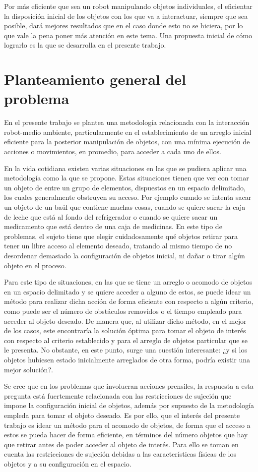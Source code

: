 Por más eficiente que sea un robot manipulando objetos individuales, el eficientar la disposición inicial de los objetos con los que va a interactuar, siempre que sea posible, dará mejores resultados que en el caso donde esto no se hiciera, por lo que vale la pena poner más atención en este tema. 
Una propuesta inicial de cómo lograrlo es la que se desarrolla en el presente trabajo.
%
%
\section{Planteamiento general del problema}
%
%
En el presente trabajo se plantea una metodología relacionada con la interacción robot-medio ambiente, particularmente en el establecimiento de un arreglo inicial eficiente para la posterior manipulación de objetos, con una mínima ejecución de acciones o movimientos, en promedio, para acceder a cada uno de ellos.

En la vida cotidiana existen varias situaciones en las que se pudiera aplicar una metodología como la que se propone.
Estas situaciones tienen que ver con tomar un objeto de entre un grupo de elementos, dispuestos en un espacio delimitado, los cuales generalmente obstruyen su acceso.
Por ejemplo cuando se intenta sacar un objeto de un baúl que contiene muchas cosas, cuando se quiere sacar la caja de leche que está al fondo del refrigerador o cuando se quiere sacar un medicamento que está dentro de una caja de medicinas. 
En este tipo de problemas, el sujeto tiene que elegir cuidadosamente qué objetos retirar para tener un libre acceso al elemento deseado, tratando al mismo tiempo de no desordenar demasiado la configuración de objetos inicial, ni dañar o tirar algún objeto en el proceso. 

Para este tipo de situaciones, en las que se tiene un arreglo o acomodo de objetos en un espacio delimitado y se quiere acceder a alguno de estos, se puede idear un método para realizar dicha acción de forma eficiente con respecto a algún criterio, como puede ser el número de obstáculos removidos o el tiempo empleado para acceder al objeto deseado.
De manera que, al utilizar dicho método, en el mejor de los casos, este encontraría la solución óptima para tomar el objeto de interés con respecto al criterio establecido y para el arreglo de objetos particular que se le presenta.
No obstante, en este punto, surge una cuestión interesante: ¿y si los objetos hubiesen estado inicialmente arreglados de otra forma, podría existir una mejor solución?.

Se cree que en los problemas que involucran acciones prensiles, la respuesta a esta pregunta está fuertemente relacionada con las restricciones de sujeción que impone la configuración inicial de objetos, además por supuesto de la metodología empleda para tomar el objeto deseado.
Es por ello, que el interés del presente trabajo es idear un método para el acomodo de objetos, de forma que el acceso a estos se pueda hacer de forma eficiente, en términos del número objetos que hay que retirar antes de poder acceder al objeto de interés.
Para ello se toman en cuenta las restricciones de sujeción debidas a las características físicas de los objetos y a su configuración en el espacio.

